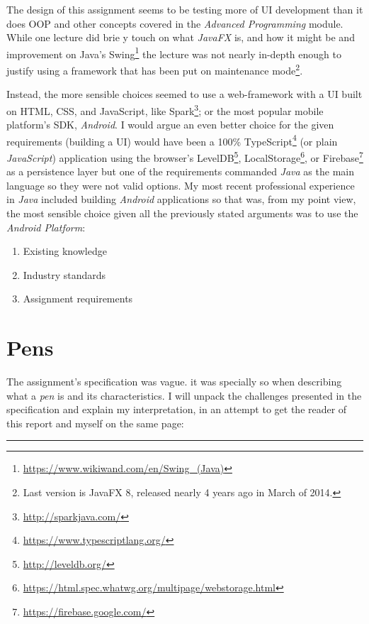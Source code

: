 \documentclass[english,a4paper,]{report}
\DeclareRobustCommand{\href}[2]{#2\footnote{\url{#1}}}
\providecommand{\tightlist}{%
  \setlength{\itemsep}{0pt}\setlength{\parskip}{0pt}}
\begin{document}
The design of this assignment seems to be testing more of UI development
than it does OOP and other concepts covered in the \emph{Advanced
Programming} module. While one lecture did brie y touch on what
\emph{JavaFX} is, and how it might be and improvement on Java's
\href{https://www.wikiwand.com/en/Swing_(Java)}{Swing} the lecture was
not nearly in-depth enough to justify using a framework that has been
put on maintenance mode\footnote{Last version is JavaFX 8, released
  nearly 4 years ago in March of 2014.}.

Instead, the more sensible choices seemed to use a web-framework with a
UI built on HTML, CSS, and JavaScript, like
\href{http://sparkjava.com/}{Spark}; or the most popular mobile
platform's SDK, \emph{Android}. I would argue an even better choice for
the given requirements (building a UI) would have been a 100\%
\href{https://www.typescriptlang.org/}{TypeScript} (or plain
\emph{JavaScript}) application using the browser's
\href{http://leveldb.org/}{LevelDB},
\href{https://html.spec.whatwg.org/multipage/webstorage.html}{LocalStorage},
or \href{https://firebase.google.com/}{Firebase} as a persistence layer
but one of the requirements commanded \emph{Java} as the main language
so they were not valid options. My most recent professional experience
in \emph{Java} included building \emph{Android} applications so that
was, from my point view, the most sensible choice given all the
previously stated arguments was to use the \emph{Android Platform}:

\begin{enumerate}
\def\labelenumi{\arabic{enumi}.}
\tightlist
\item
  Existing knowledge
\item
  Industry standards
\item
  Assignment requirements
\end{enumerate}

\hypertarget{pens}{%
\section{Pens}\label{pens}}

The assignment's specification was vague. it was specially so when
describing what a \emph{pen} is and its characteristics. I will unpack
the challenges presented in the specification and explain my
interpretation, in an attempt to get the reader of this report and
myself on the same page:

\begin{center}\rule{0.5\linewidth}{\linethickness}\end{center}
\end{document}
